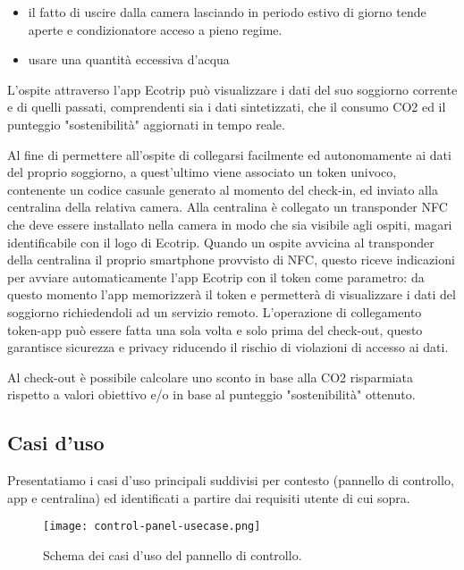 \begin{itemize}
    \item il fatto di uscire dalla camera lasciando in periodo estivo di giorno tende aperte e condizionatore acceso a pieno regime.
    \item usare una quantità eccessiva d'acqua
\end{itemize}

L'ospite attraverso l'app Ecotrip può visualizzare i dati del suo soggiorno
corrente e di quelli passati, comprendenti sia i dati sintetizzati, che il
consumo CO2 ed il punteggio "sostenibilità" aggiornati in tempo reale.

Al fine di permettere all'ospite di collegarsi facilmente ed autonomamente ai
dati del proprio soggiorno, a quest'ultimo viene associato un token univoco,
contenente un codice casuale generato al momento del check-in, ed inviato alla
centralina della relativa camera. Alla centralina è collegato un transponder NFC
che deve essere installato nella camera in modo che sia visibile agli ospiti,
magari identificabile con il logo di Ecotrip. Quando un ospite avvicina al
transponder della centralina il proprio smartphone provvisto di NFC, questo
riceve indicazioni per avviare automaticamente l'app Ecotrip con il token come
parametro: da questo momento l'app memorizzerà il token e permetterà di
visualizzare i dati del soggiorno richiedendoli ad un servizio remoto.
L'operazione di collegamento token-app può essere fatta una sola volta e solo
prima del check-out, questo garantisce sicurezza e privacy riducendo il rischio
di violazioni di accesso ai dati.

Al check-out è possibile calcolare uno sconto in base alla CO2 risparmiata
rispetto a valori obiettivo e/o in base al punteggio "sostenibilità" ottenuto.

\subsection{Casi d'uso}
Presentatiamo i casi d'uso principali suddivisi per contesto (pannello di controllo, app e centralina) ed 
identificati a partire dai requisiti utente di cui sopra. 

\begin{figure}[H]
    \hspace*{-1.5cm}\texttt{[image: control-panel-usecase.png]}
    \centering
    \caption[control-panel-usecase]{Schema dei casi d'uso del pannello di controllo.}
    \label{fig:cp-usecase}
\end{figure}

